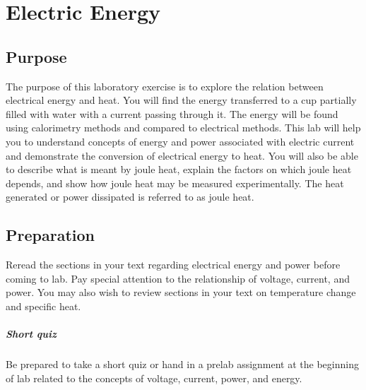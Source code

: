 \chapter{Electric Energy}

\section{Purpose}
  The purpose of this laboratory exercise is to explore the relation between electrical energy and heat. You will find the energy transferred to a cup partially filled with water with a current passing through it.  The energy will be found using calorimetry methods and compared to electrical methods.  This lab will help you to understand concepts of energy and power associated with electric current and demonstrate the conversion of electrical energy to heat. You will also be able to describe what is meant by joule heat, explain the factors on which joule heat depends, and show how joule heat may be measured experimentally. The heat generated or power dissipated is referred to as joule heat.

\section{Preparation}
  Reread the sections in your text regarding electrical energy and power before coming to lab. Pay special attention to the relationship of voltage, current, and power.  You may also wish to review sections in your text on temperature change and specific heat.
\paragraph{Short quiz }
 Be prepared to take a short quiz or hand in a prelab assignment at the beginning of lab related to the concepts of voltage, current, power, and energy.

